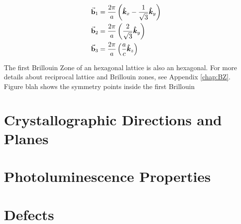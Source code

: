 \begin{align}
	\va{b}_1 &= \frac{2 \pi}{a} \left(\vu*{k}_x - \frac{1}{\sqrt{3}} \vu*{k}_y \right) \\ 
	\va{b}_2 &= \frac{2 \pi}{a} \left( \frac{2}{\sqrt{3}} \vu*{k}_y \right) \\
	\va{b}_3 &= \frac{2 \pi}{a} \left( \frac{a}{c} \vu*{k}_z  \right)
\end{align}

The first Brillouin Zone of an hexagonal lattice is also an hexagonal. For more details about reciprocal lattice and Brillouin zones, see Appendix \ref{chap:BZ}.  Figure blah shows the symmetry points inside the first Brillouin

	
\section{Crystallographic Directions and Planes}

\section{Photoluminescence Properties}
\section{Defects}

